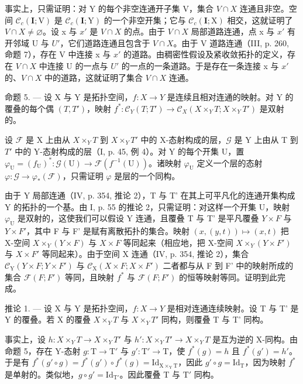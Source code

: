 事实上，只需证明：对 Y 的每个非空连通开子集 V，集合 \(V \cap X\) 连通且非空。空间 \(\mathcal{C}_{c}(\mathbf{I};\mathrm{V})\) 是 \(\mathcal{C}_{c}(\mathbf{I};\mathrm{Y})\) 的一个非空开集；它与 \(\mathcal{C}_{c}(\mathbf{I};\mathrm{X})\) 相交，这就证明了 \(V \cap X \neq \varnothing\)。设 x 与 \(x'\) 是 \(V \cap X\) 的点。由于 \(V \cap X\) 局部道路连通，点 x 与 \(x'\) 有开邻域 U 与 \(U'\)，它们道路连通且包含于 \(V \cap X\)。由于 V 道路连通（III, p. 260, 命题 7），存在 V 中连接 x 与 \(x'\) 的道路。由稠密性假设及紧收敛拓扑的定义，存在 \(V \cap X\) 中连接 U 的一点与 \(U'\) 的一点的一条道路。于是存在一条连接 x 与 \(x'\) 的、\(V \cap X\) 中的道路，这就证明了集合 \(V \cap X\) 连通。

命题 5. --- 设 X 与 Y 是拓扑空间，\(f: X \to Y\) 是连续且相对连通的映射。对 Y 的覆叠的每个偶 \((T, T')\)，映射 \(f^{*}: \mathcal{C}_{Y}(T; T') \to \mathcal{C}_{X}(X \times_{Y} T; X \times_{Y} T')\) 是双射的。

设 \(\mathcal{F}\) 是 X 上由从 \(X \times_{Y} T\) 到 \(X \times_{Y} T'\) 中的 X-态射构成的层，\(\mathcal{G}\) 是 Y 上由从 T 到 \(T'\) 中的 Y-态射构成的层（I, p. 45, 例 4）。对 Y 的每个开集 U，置 \(\varphi_{\mathrm{U}} = (f_{\mathrm{U}})^{*}: \mathcal{G}(\mathrm{U}) \to \mathcal{F}(f^{-1}(\mathrm{U}))\)。诸映射 \(\varphi_{\mathrm{U}}\) 定义一个层的态射 \(\varphi: \mathcal{G} \to \varphi_{*}(\mathcal{F})\)，只需证明 \(\varphi\) 是层的一个同构。

由于 Y 局部连通（IV, p. 354, 推论 2），T 与 T' 在其上可平凡化的连通开集构成 Y 的拓扑的一个基。由 I, p. 55 的推论 2，只需证明：对这样一个开集 U，映射 \(\varphi_{\mathrm{U}}\) 是双射的，这使我们可以假设 Y 连通，且覆叠 T 与 T' 是平凡覆叠 \(Y \times F\) 与 \(Y \times F'\)，其中 F 与 F' 是赋有离散拓扑的集合。映射 \((x, (y, t)) \mapsto (x, t)\) 把 X-空间 \(X \times_{Y} (Y \times F)\) 与 \(X \times F\) 等同起来（相应地，把 X-空间 \(X \times_{Y} (Y \times F')\) 与 \(X \times F'\) 等同起来）。由于空间 X 连通（IV, p. 354, 推论 2），集合 \(\mathcal{C}_{\mathrm{Y}}(Y \times F; Y \times F')\) 与 \(\mathcal{C}_{\mathrm{X}}(X \times F; X \times F')\) 二者都与从 F 到 F' 中的映射所成的集合 \(\mathcal{F}(F;F')\) 等同，且映射 \(f^{*}\) 与 \(\mathcal{F}(F;F')\) 的恒等映射等同。证明到此完成。

推论 1. --- 设 X 与 Y 是拓扑空间，\(f: X \to Y\) 是相对连通连续映射。设 T 与 T' 是 Y 的覆叠。若 X 的覆叠 \(X \times_Y T\) 与 \(X \times_Y T'\) 同构，则覆叠 T 与 T' 同构。

事实上，设 \(h \colon X \times_{Y} T \to X \times_{Y} T'\) 与 \(h' \colon X \times_{Y} T' \to X \times_{Y} T\) 是互为逆的 X-同构。由命题 5，存在 Y-态射 \(g \colon \mathrm{T} \to \mathrm{T}'\) 与 \(g' \colon \mathrm{T}' \to \mathrm{T}\)，使 \(f^{*}(g) = h\) 且 \(f^{*}(g') = h'\)。于是有 \(f^{*}(g' \circ g) = f^{*}(g') \circ f^{*}(g) = \mathrm{Id}_{\mathrm{X} \times_{\mathrm{Y}} \mathrm{T}}\)，因此 \(g' \circ g = \mathrm{Id}_{\mathrm{T}}\)，因为映射 \(f^{*}\) 是单射的。类似地，\(g \circ g' = \mathrm{Id}_{\mathrm{T}'}\)。因此覆叠 T 与 \(\mathrm{T}'\) 同构。

